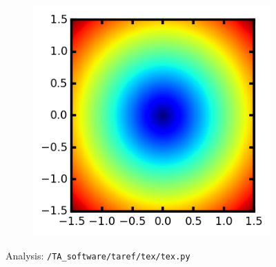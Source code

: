 \documentclass[12pt,a4paper]{article}
\begin{document}
\setcounter{subfigure}{0} %
\begin{figure}[ht!]
\centering
\begin{subfigure}[b]{0.49\textwidth}
\includegraphics[width=\textwidth]{test_colormap_plot.png}
\end{subfigure}
\label{fig:setup}
\cprotect\caption{Analysis: \verb;/TA_software/taref/tex/tex.py;}
\end{figure}
\end{document}
